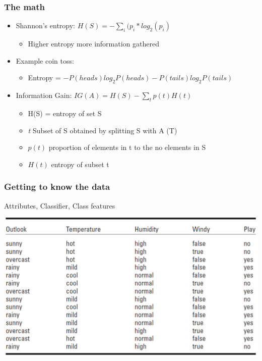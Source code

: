 \begin{frame}
\frametitle{The math}
\begin{itemize}
\item Shannon's entropy: $H(S)= - \sum_{i}{} (p_i*log_2(p_i)$
\vfill
\begin{itemize}
\vfill
\item Higher entropy more information gathered
\end{itemize}
\vfill
\item Example coin toss:
\begin{itemize}
\vfill
\item Entropy = $- P(heads)log_2P(heads)-P(tails)log_2P(tails)$
\vfill
\end{itemize}
\item Information Gain: $IG(A)=H(S)- \sum_{t}{}p(t)H(t)$
\begin{itemize}
\item H(S) = entropy of set S
\item \textit{t} Subset of S obtained by splitting S with A (T)
\item $p(t)$ proportion of elements in t to the no elements in S
\item $H(t)$ entropy of subset t
\end{itemize}
\end{itemize}
\end{frame}

\begin{frame}
\frametitle{Getting to know the data}
Attributes, Classifier, Class features
\begin{center}
\includegraphics[scale=.3]{Images/tennis.jpg}
\end{center}
\end{frame}

